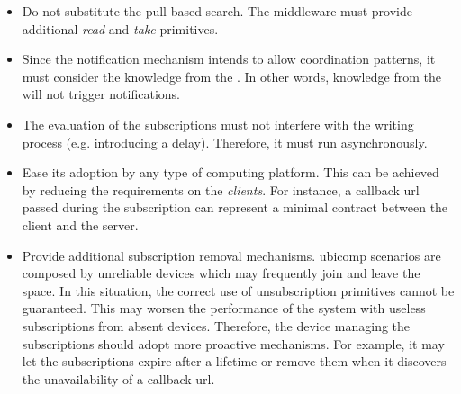 \begin{itemize}
  \item Do not substitute the pull-based search. %
        The middleware must provide additional \emph{read} and \emph{take} primitives.
  \item Since the notification mechanism intends to allow coordination patterns,
        it must consider the knowledge from the \coordspace{}. %
        In other words, knowledge from the \outerspace{} will not trigger notifications. %
  \item The evaluation of the subscriptions must not interfere with the writing process (e.g. introducing a delay).
        Therefore, it must run asynchronously.
  \item Ease its adoption by any type of computing platform.
	This can be achieved by reducing the requirements on the \emph{clients}.
        For instance, a callback \ac{url} passed during the subscription can represent a minimal contract between the client and the server. %
  \item Provide additional subscription removal mechanisms.
	\ac{ubicomp} scenarios are composed by unreliable devices which may frequently join and leave the space.
	In this situation, the correct use of unsubscription primitives cannot be guaranteed.
	This may worsen the performance of the system with useless subscriptions from absent devices.
	Therefore, the device managing the subscriptions should adopt more proactive mechanisms.
	For example, it may let the subscriptions expire after a lifetime or remove them when it discovers the unavailability of a callback \ac{url}. %
\end{itemize}


